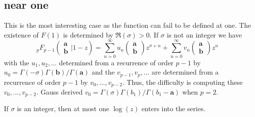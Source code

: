 \documentclass[12pt]{article}
\numberwithin{equation}{section}
\newcommand{\FF}[6] {{}_{#1}{#2}_{#3} \left( \begin{array}{c} #4 \\ #5 \end{array} \Big| {#6}  \right)}
\newcommand{\bfa}[0] {\mathbf{a}}
\begin{document}
\subsection{near one}
This is the most interesting case as the function can fail to be defined at one. The existence of $F(1)$ is determined by $\Re(\sigma)> 0$. If $\sigma$ is not an integer we have
\begin{equation}
\label{nearone}
\FF{p}{F}{p-1}{\mathbf{a}}{\mathbf{b}}{1-z} = \sum_{n=0}^{\infty} u_n \left(\begin{array}{c} \mathbf{a}\\\mathbf{b}\end{array} \right) z^{\sigma+n} + \sum_{n=0}^{\infty} v_n \left(\begin{array}{c} \mathbf{a}\\\mathbf{b}\end{array} \right) z^n
\end{equation}
with the $u_1,u_2,\dots$ determined from a recurrence of order $p-1$ by $u_0 = \Gamma(-\sigma)\Gamma(\mathbf{b})/\Gamma(\mathbf{a})$ and the $v_{p-1}, v_p, \dots$ are determined from a recurrence of order $p-1$ by $v_0, \dots, v_{p-2}$. Thus, the difficulty is computing these $v_0, \dots, v_{p-2}$. Gauss derived $v_0 = \Gamma(\sigma)\Gamma(b_1)/\Gamma(b_1-\bfa)$ when $p=2$.

If $\sigma$ is an integer, then at most one $\log(z)$ enters into the series.
\end{document}
